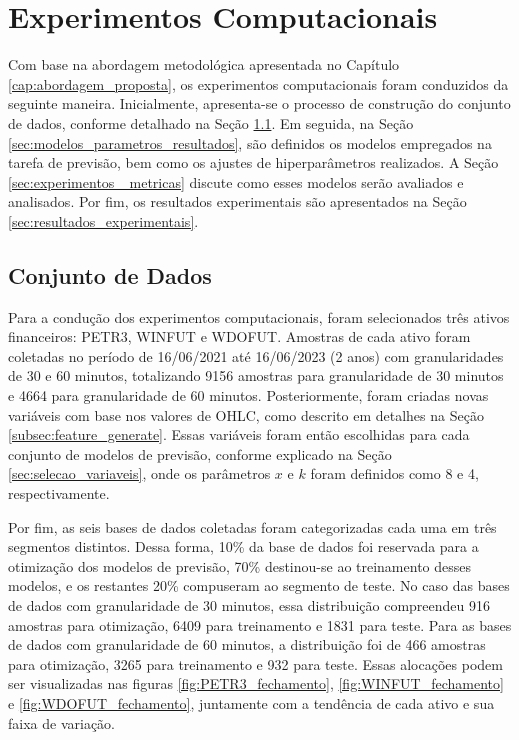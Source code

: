 \chapter{Experimentos Computacionais}
\label{cap:experimentos}
Com base na abordagem metodológica apresentada no Capítulo \ref{cap:abordagem_proposta}, os experimentos computacionais foram conduzidos da seguinte maneira. Inicialmente, apresenta-se o processo de construção do conjunto de dados, conforme detalhado na Seção \ref{sec:conjunto_dados_resultados}. Em seguida, na Seção \ref{sec:modelos_parametros_resultados}, são definidos os modelos empregados na tarefa de previsão, bem como os ajustes de hiperparâmetros realizados. A Seção \ref{sec:experimentos _metricas} discute como esses modelos serão avaliados e analisados. Por fim, os resultados experimentais são apresentados na Seção \ref{sec:resultados_experimentais}.


\section{Conjunto de Dados}
\label{sec:conjunto_dados_resultados}
Para a condução dos experimentos computacionais, foram selecionados três ativos financeiros: PETR3, WINFUT e WDOFUT. Amostras de cada ativo foram coletadas no período de 16/06/2021 até 16/06/2023 (2 anos) com granularidades de 30 e 60 minutos, totalizando 9156 amostras para granularidade de 30 minutos e 4664 para granularidade de 60 minutos.
Posteriormente, foram criadas novas variáveis com base nos valores de \ac{OHLC}, como descrito em detalhes na Seção \ref{subsec:feature_generate}. Essas variáveis foram então escolhidas para cada conjunto de modelos de previsão, conforme explicado na Seção \ref{sec:selecao_variaveis}, onde os parâmetros $x$ e $k$ foram definidos como 8 e 4, respectivamente.

Por fim, as seis bases de dados coletadas foram categorizadas cada uma em três segmentos distintos. Dessa forma, 10\% da base de dados foi reservada para a otimização dos modelos de previsão, 70\% destinou-se ao treinamento desses modelos, e os restantes 20\% compuseram ao segmento de teste. No caso das bases de dados com granularidade de 30 minutos, essa distribuição compreendeu 916 amostras para otimização, 6409 para treinamento e 1831 para teste. Para as bases de dados com granularidade de 60 minutos, a distribuição foi de 466 amostras para otimização, 3265 para treinamento e 932 para teste. Essas alocações podem ser visualizadas nas figuras \ref{fig:PETR3_fechamento}, \ref{fig:WINFUT_fechamento} e \ref{fig:WDOFUT_fechamento}, juntamente com a tendência de cada ativo e sua faixa de variação.

